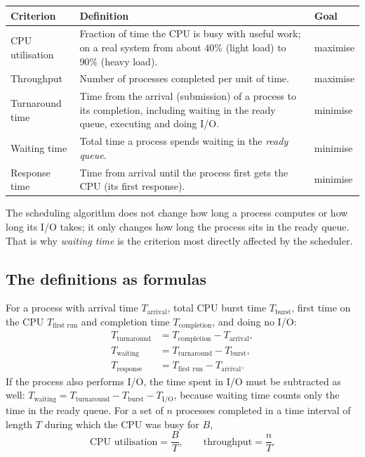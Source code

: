 \documentclass[11pt,a4paper]{article}
\begin{document}
\begin{center}
\renewcommand{\arraystretch}{1.3}
\begin{tabularx}{\linewidth}{>{\raggedright\arraybackslash}p{3.0cm} X l}
\toprule
\textbf{Criterion} & \textbf{Definition} & \textbf{Goal} \\
\midrule
CPU utilisation & Fraction of time the CPU is busy with useful work; on a real system from about $40\%$ (light load) to $90\%$ (heavy load). & maximise \\
Throughput & Number of processes completed per unit of time. & maximise \\
Turnaround time & Time from the arrival (submission) of a process to its completion, including waiting in the ready queue, executing and doing I/O. & minimise \\
Waiting time & Total time a process spends waiting in the \emph{ready queue}. & minimise \\
Response time & Time from arrival until the process first gets the CPU (its first response). & minimise \\
\bottomrule
\end{tabularx}
\end{center}

The scheduling algorithm does not change how long a process computes or how long its I/O takes; it only changes how long the process sits in the ready queue. That is why \emph{waiting time} is the criterion most directly affected by the scheduler.

\subsection{The definitions as formulas}

For a process with arrival time $T_{\text{arrival}}$, total CPU burst time $T_{\text{burst}}$, first time on the CPU $T_{\text{first run}}$ and completion time $T_{\text{completion}}$, and doing no I/O:
\begin{align*}
T_{\text{turnaround}} &= T_{\text{completion}} - T_{\text{arrival}},\\
T_{\text{waiting}} &= T_{\text{turnaround}} - T_{\text{burst}},\\
T_{\text{response}} &= T_{\text{first run}} - T_{\text{arrival}}.
\end{align*}
If the process also performs I/O, the time spent in I/O must be subtracted as well: $T_{\text{waiting}} = T_{\text{turnaround}} - T_{\text{burst}} - T_{\text{I/O}}$, because waiting time counts only the time in the ready queue. For a set of $n$ processes completed in a time interval of length $T$ during which the CPU was busy for $B$,
\[
\text{CPU utilisation} = \frac{B}{T}, \qquad \text{throughput} = \frac{n}{T}.
\]
\end{document}
